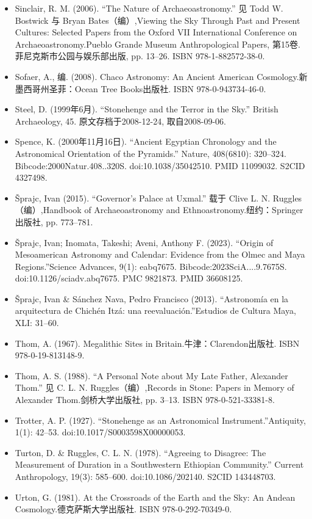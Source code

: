 \begin{itemize}
    \item Sinclair, R. M. (2006). “The Nature of Archaeoastronomy.” 见 Todd W. Bostwick 与 Bryan Bates（编）,Viewing the Sky Through Past and Present Cultures: Selected Papers from the Oxford VII International Conference on Archaeoastronomy.Pueblo Grande Museum Anthropological Papers, 第15卷. 菲尼克斯市公园与娱乐部出版, pp. 13–26. ISBN 978-1-882572-38-0.
    \item Sofaer, A., 编. (2008). Chaco Astronomy: An Ancient American Cosmology.新墨西哥州圣菲：Ocean Tree Books出版社. ISBN 978-0-943734-46-0.
    \item Steel, D. (1999年6月). “Stonehenge and the Terror in the Sky.” British Archaeology, 45. 原文存档于2008-12-24, 取自2008-09-06.
    \item Spence, K. (2000年11月16日). “Ancient Egyptian Chronology and the Astronomical Orientation of the Pyramids.” Nature, 408(6810): 320–324. Bibcode:2000Natur.408..320S. doi:10.1038/35042510. PMID 11099032. S2CID 4327498.
    \item Šprajc, Ivan (2015). “Governor’s Palace at Uxmal.” 载于 Clive L. N. Ruggles（编）,Handbook of Archaeoastronomy and Ethnoastronomy.纽约：Springer出版社, pp. 773–781.
    \item Šprajc, Ivan; Inomata, Takeshi; Aveni, Anthony F. (2023). “Origin of Mesoamerican Astronomy and Calendar: Evidence from the Olmec and Maya Regions.”Science Advances, 9(1): eabq7675. Bibcode:2023SciA....9.7675S. doi:10.1126/sciadv.abq7675. PMC 9821873. PMID 36608125.
    \item Šprajc, Ivan \& Sánchez Nava, Pedro Francisco (2013). “Astronomía en la arquitectura de Chichén Itzá: una reevaluación.”Estudios de Cultura Maya, XLI: 31–60.
    \item Thom, A. (1967). Megalithic Sites in Britain.牛津：Clarendon出版社. ISBN 978-0-19-813148-9.
    \item Thom, A. S. (1988). “A Personal Note about My Late Father, Alexander Thom.” 见 C. L. N. Ruggles（编）,Records in Stone: Papers in Memory of Alexander Thom.剑桥大学出版社, pp. 3–13. ISBN 978-0-521-33381-8.
    \item Trotter, A. P. (1927). “Stonehenge as an Astronomical Instrument.”Antiquity, 1(1): 42–53. doi:10.1017/S0003598X00000053.
    \item Turton, D. \& Ruggles, C. L. N. (1978). “Agreeing to Disagree: The Measurement of Duration in a Southwestern Ethiopian Community.” Current Anthropology, 19(3): 585–600. doi:10.1086/202140. S2CID 143448703.
    \item Urton, G. (1981). At the Crossroads of the Earth and the Sky: An Andean Cosmology.德克萨斯大学出版社. ISBN 978-0-292-70349-0.

\end{itemize}
